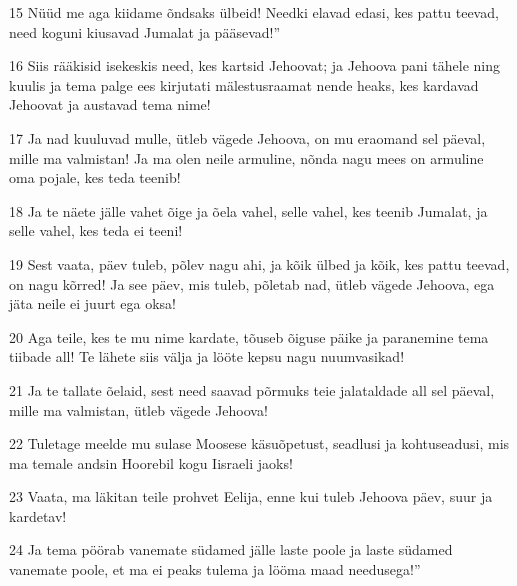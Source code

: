 \par 15 Nüüd me aga kiidame õndsaks ülbeid! Needki elavad edasi, kes pattu teevad, need koguni kiusavad Jumalat ja pääsevad!”
\par 16 Siis rääkisid isekeskis need, kes kartsid Jehoovat; ja Jehoova pani tähele ning kuulis ja tema palge ees kirjutati mälestusraamat nende heaks, kes kardavad Jehoovat ja austavad tema nime!
\par 17 Ja nad kuuluvad mulle, ütleb vägede Jehoova, on mu eraomand sel päeval, mille ma valmistan! Ja ma olen neile armuline, nõnda nagu mees on armuline oma pojale, kes teda teenib!
\par 18 Ja te näete jälle vahet õige ja õela vahel, selle vahel, kes teenib Jumalat, ja selle vahel, kes teda ei teeni!
\par 19 Sest vaata, päev tuleb, põlev nagu ahi, ja kõik ülbed ja kõik, kes pattu teevad, on nagu kõrred! Ja see päev, mis tuleb, põletab nad, ütleb vägede Jehoova, ega jäta neile ei juurt ega oksa!
\par 20 Aga teile, kes te mu nime kardate, tõuseb õiguse päike ja paranemine tema tiibade all! Te lähete siis välja ja lööte kepsu nagu nuumvasikad!
\par 21 Ja te tallate õelaid, sest need saavad põrmuks teie jalataldade all sel päeval, mille ma valmistan, ütleb vägede Jehoova!
\par 22 Tuletage meelde mu sulase Moosese käsuõpetust, seadlusi ja kohtuseadusi, mis ma temale andsin Hoorebil kogu Iisraeli jaoks!
\par 23 Vaata, ma läkitan teile prohvet Eelija, enne kui tuleb Jehoova päev, suur ja kardetav!
\par 24 Ja tema pöörab vanemate südamed jälle laste poole ja laste südamed vanemate poole, et ma ei peaks tulema ja lööma maad needusega!”





